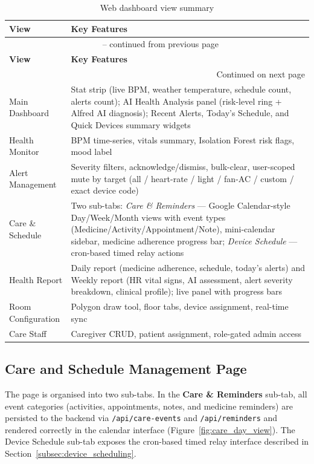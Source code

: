 {\small
\begin{longtable}{l p{11cm}}
\caption{Web dashboard view summary}
\label{tab:web_screens_result} \\
\toprule
\textbf{View} & \textbf{Key Features} \\
\midrule
\endfirsthead
\multicolumn{2}{c}{{\tablename\ \thetable{} -- continued from previous page}} \\
\toprule
\textbf{View} & \textbf{Key Features} \\
\midrule
\endhead
\midrule
\multicolumn{2}{r}{{Continued on next page}} \\
\endfoot
\bottomrule
\endlastfoot
Main Dashboard        & Stat strip (live BPM, weather temperature, schedule count, alerts count); AI Health Analysis panel (risk-level ring + Alfred AI diagnosis); Recent Alerts, Today's Schedule, and Quick Devices summary widgets \\[3pt]
Health Monitor        & BPM time-series, vitals summary, Isolation Forest risk flags, mood label \\[3pt]
Alert Management      & Severity filters, acknowledge/dismiss, bulk-clear, user-scoped mute by target (all / heart-rate / light / fan-AC / custom / exact device code) \\[3pt]
Care \& Schedule      & Two sub-tabs: \textit{Care \& Reminders} — Google Calendar-style Day/Week/Month views with event types (Medicine/Activity/Appointment/Note), mini-calendar sidebar, medicine adherence progress bar; \textit{Device Schedule} — cron-based timed relay actions \\[3pt]
Health Report         & Daily report (medicine adherence, schedule, today's alerts) and Weekly report (HR vital signs, AI assessment, alert severity breakdown, clinical profile); live panel with progress bars \\[3pt]
Room Configuration    & Polygon draw tool, floor tabs, device assignment, real-time sync \\[3pt]
Care Staff            & Caregiver CRUD, patient assignment, role-gated admin access \\
\end{longtable}
}


\subsection{Care and Schedule Management Page}

The page is organised into two sub-tabs. In the \textbf{Care \& Reminders} sub-tab, all event categories (activities, appointments, notes, and medicine reminders)
are persisted to the backend via \texttt{/api/care-events} and
\texttt{/api/reminders} and rendered correctly in the calendar interface
(Figure~\ref{fig:care_day_view}). The Device Schedule sub-tab exposes the
cron-based timed relay interface described in
Section~\ref{subsec:device_scheduling}.

